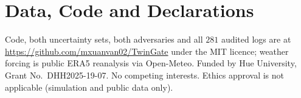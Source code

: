 


\section*{Data, Code and Declarations}

Code, both uncertainty sets, both adversaries and all $281$ audited logs are at
\url{https://github.com/mxuanvan02/TwinGate} under the MIT licence; weather forcing is
public ERA5 reanalysis via Open-Meteo. Funded by Hue University, Grant
No.~DHH2025-19-07. No competing interests. Ethics approval is not applicable
(simulation and public data only).







